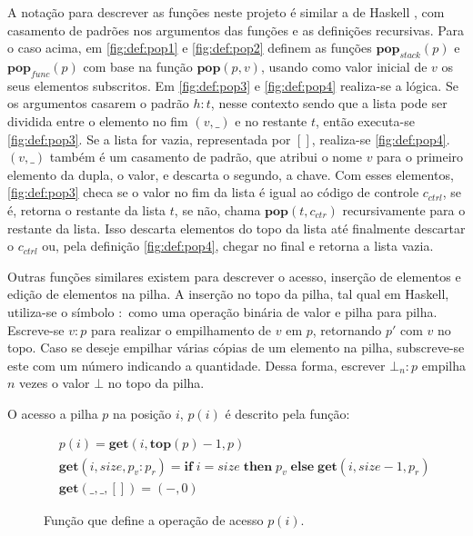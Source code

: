 A notação para descrever as funções neste projeto é similar a de Haskell \cite{HASKELL}, com casamento de padrões nos argumentos das funções e as definições recursivas. Para o caso acima, em \ref{fig:def:pop1} e \ref{fig:def:pop2} definem as funções $\mathbf{pop}_{stack}(p)$ e $\mathbf{pop}_{func}(p)$ com base na função $\mathbf{pop}(p, v)$, usando como valor inicial de $v$ os seus elementos subscritos. Em \ref{fig:def:pop3} e \ref{fig:def:pop4} realiza-se a lógica. Se os argumentos casarem o padrão $h : t$, nesse contexto sendo que a lista pode ser dividida entre o elemento no fim $(v, \_)$ e no restante $t$, então executa-se \ref{fig:def:pop3}. Se a lista for vazia, representada por $[]$, realiza-se \ref{fig:def:pop4}. $(v,\_)$ também é um casamento de padrão, que atribui o nome $v$ para o primeiro elemento da dupla, o valor, e descarta o segundo, a chave. Com esses elementos, \ref{fig:def:pop3} checa se o valor no fim da lista é igual ao código de controle $c_{ctrl}$, se é, retorna o restante da lista $t$, se não, chama $\mathbf{pop}(t, c_{ctr})$ recursivamente para o restante da lista. Isso descarta elementos do topo da lista até finalmente descartar o $c_{ctrl}$ ou, pela definição \ref{fig:def:pop4}, chegar no final e retorna a lista vazia.

Outras funções similares existem para descrever o acesso, inserção de elementos e edição de elementos na pilha. A inserção no topo da pilha, tal qual em Haskell, utiliza-se o símbolo $:$ como uma operação binária de valor e pilha para pilha. Escreve-se $v : p$ para realizar o empilhamento de $v$ em $p$, retornando $p'$ com $v$ no topo. Caso se deseje empilhar várias cópias de um elemento na pilha, subscreve-se este com um número indicando a quantidade. Dessa forma, escrever $\bot_n : p$ empilha $n$ vezes o valor $\bot$ no topo da pilha. 

O acesso a pilha $p$ na posição $i$, $p(i)$ é descrito pela função:

\begin{figure}[ht]
	\begin{align}
	&p(i) = \mathbf{get}(i, \mathbf{top}(p) - 1, p) \label{fig:def:px1}\\
	&\mathbf{get}(i, size, p_v : p_r) = \mathbf{if}\;i = size \;\mathbf{then}\;p_v\;\mathbf{else}\;\mathbf{get}(i, size - 1, p_r) \label{fig:def:px2}\\
	&\mathbf{get}(\_, \_, []) = (-,0) \label{fig:def:px3}
	\end{align}
	\caption{Função que define a operação de acesso $p(i)$.}
	\label{fig:def:px}
\end{figure}

